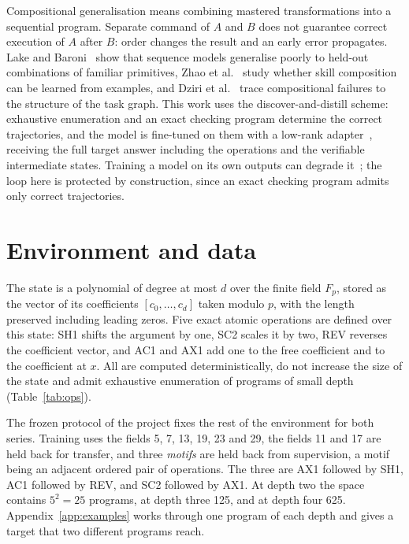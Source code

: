 \documentclass{zapiski}
\begin{document}
Compositional generalisation means combining mastered transformations into a sequential
program. Separate command of $A$ and $B$ does not guarantee correct execution of $A$
after $B$: order changes the result and an early error propagates. Lake and
Baroni~\cite{lake2018systematicity} show that sequence models generalise poorly to
held-out combinations of familiar primitives, Zhao et al.~\cite{zhao2024skill} study
whether skill composition can be learned from examples, and Dziri et
al.~\cite{dziri2023faith} trace compositional failures to the structure of the task
graph. This work uses the discover-and-distill scheme: exhaustive enumeration and an
exact checking program determine the correct trajectories, and the model is fine-tuned
on them with a low-rank adapter~\cite{hu2022lora}, receiving the full target answer
including the operations and the verifiable intermediate states. Training a model on
its own outputs can degrade it~\cite{shumailov2024collapse}; the loop here is protected
by construction, since an exact checking program admits only correct trajectories.

\section{Environment and data}
\label{sec:env}

The state is a polynomial of degree at most $d$ over the finite field $F_p$, stored as
the vector of its coefficients $[c_0, \ldots, c_d]$ taken modulo $p$, with the length
preserved including leading zeros. Five exact atomic operations are defined over this
state: SH1 shifts the argument by one, SC2 scales it by two, REV reverses the
coefficient vector, and AC1 and AX1 add one to the free coefficient and to the
coefficient at $x$. All are computed deterministically, do not increase the size of the
state and admit exhaustive enumeration of programs of small depth
(Table~\ref{tab:ops}).

The frozen protocol of the project fixes the rest of the environment for both
series. Training uses the fields 5, 7, 13, 19, 23 and 29, the fields 11 and 17 are
held back for transfer, and three \emph{motifs} are held back from supervision, a
motif being an adjacent ordered pair of operations. The three are AX1 followed by
SH1, AC1 followed by REV, and SC2 followed by AX1. At depth two the space contains
$5^2 = 25$ programs, at depth three 125, and at depth four 625.
Appendix~\ref{app:examples} works through one program of each depth and gives a
target that two different programs reach.
\end{document}
